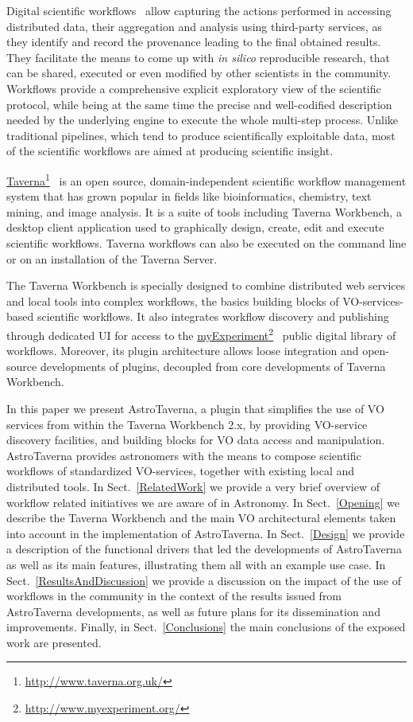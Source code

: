 \documentclass[final,authoryear,5p,times,twocolumn]{elsarticle}
\newcommand{\urlsamefont}[1]{\urlstyle{same}\url{#1}}
\newcommand{\hrefnote}[2]{\href{#1}{#2}\footnote{\urlsamefont{#1}}}
\begin{document}
Digital scientific workflows~\citep{Gil2007, Gil2008} allow capturing the actions performed in accessing distributed data, their aggregation and analysis using third-party services, as they identify and record the provenance leading to the final obtained results. They facilitate the means to come up with \emph{in silico} reproducible research, that can be shared, executed or even modified by other scientists in the community. Workflows provide a comprehensive explicit exploratory view of the scientific protocol, while being at the same time the precise and well-codified description needed by the underlying engine to execute the whole multi-step process. Unlike traditional pipelines, which tend to produce scientifically exploitable data, most of the scientific workflows are aimed at producing scientific insight.

\hrefnote{http://www.taverna.org.uk/}{Taverna}~\citep{Wolstencroft01072013} is an open source, domain-independent scientific workflow management system that has grown popular in fields like bioinformatics, chemistry, text mining, and image analysis. It is a suite of tools including Taverna Workbench, a desktop client application used to graphically design, create, edit and execute scientific workflows. Taverna workflows can also be executed on the command line or on an installation of the Taverna Server.

The Taverna Workbench is specially designed to combine distributed web services and local tools into complex workflows, the basics building blocks of VO-services-based scientific workflows. It also integrates workflow discovery and publishing through dedicated UI for access to the \hrefnote{http://www.myexperiment.org/}{myExperiment}~\citep{Goble2010} public digital library of workflows. Moreover, its plugin architecture allows loose integration and open-source developments of plugins, decoupled from core developments of Taverna Workbench.

In this paper we present AstroTaverna, a plugin that simplifies the use of VO services from within the Taverna Workbench 2.x, by providing VO-service discovery facilities, and building blocks for VO data access and manipulation. AstroTaverna provides astronomers with the means to compose scientific workflows of standardized VO-services, together with existing local and distributed tools. In Sect.~\ref{RelatedWork} we provide a very brief overview of workflow related initiatives we are aware of in Astronomy. In Sect.~\ref{Opening} we describe the Taverna Workbench and the main VO architectural elements taken into account in the implementation of AstroTaverna. In Sect.~\ref{Design} we provide a description of the functional drivers that led the developments of AstroTaverna as well as its main features, illustrating them all with an example use case. In Sect.~\ref{ResultsAndDiscussion} we provide a discussion on the impact of the use of workflows in the community in the context of the results issued from AstroTaverna developments, as well as future plans for its dissemination and improvements. Finally, in Sect.~\ref{Conclusions} the main conclusions of the exposed work are presented. 
\end{document}
